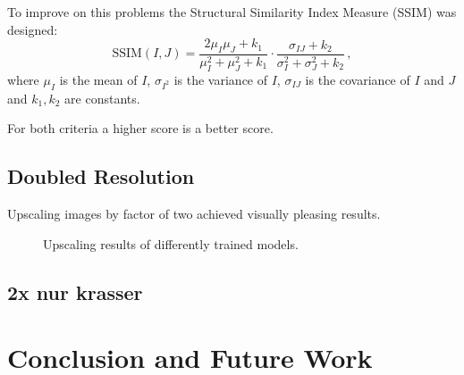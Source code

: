 \documentclass{scrartcl}
\begin{document}
To improve on this problems the Structural Similarity Index Measure (SSIM) was designed:
\[
	\mathrm{SSIM}(I, J)
	= \frac{2\mu_I\mu_J + k_1}{\mu_I^2+\mu_J^2+k_1} \cdot \frac{\sigma_{IJ} + k_2}{\sigma_I^2 + \sigma_J^2 + k_2}
	\,,
\]
where \( \mu_I \) is the mean of \( I \), \( \sigma_{I^2} \) is the variance of \( I \), \( \sigma_{IJ} \) is the covariance of \( I \) and \( J \) and \( k_1, k_2 \) are constants.

For both criteria a higher score is a better score.

\subsection{Doubled Resolution}

Upscaling images by factor of two achieved visually pleasing results.



\begin{figure}
	\begin{center}
		
		\caption{Upscaling results of differently trained models.}
		\label{fig:2x_upscaling_single}
	\end{center}
\end{figure}

\subsection{2x nur krasser}

\section{Conclusion and Future Work}

\pagebreak
\nocite{*}
\printbibliography
\end{document}
